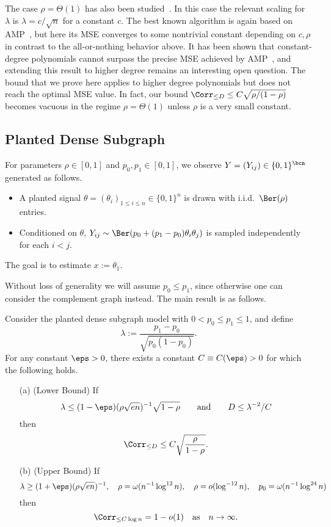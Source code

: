 \documentclass[11pt]{article}
\begin{document}
The case $\rho = \Theta(1)$ has also been studied~\cite{DM-sparse-amp,LKZ-sparse,submatrix-ogp,MW-amp}. In this case the relevant scaling for $\lambda$ is $\lambda = c/\sqrt{n}$ for a constant $c$. The best known algorithm is again based on AMP~\cite{DM-sparse-amp,LKZ-sparse}, but here its MSE converges to some nontrivial constant depending on $c,\rho$ in contrast to the all-or-nothing behavior above. It has been shown that constant-degree polynomials cannot surpass the precise MSE achieved by AMP~\cite{MW-amp}, and extending this result to higher degree remains an interesting open question. The bound that we prove here applies to higher degree polynomials but does not reach the optimal MSE value. In fact, our bound $\Corr_{\le D} \le C\sqrt{\rho/(1-\rho)}$ becomes vacuous in the regime $\rho = \Theta(1)$ unless $\rho$ is a very small constant.




\subsection{Planted Dense Subgraph}

\begin{definition}
For parameters $\rho \in [0,1]$ and $p_0,p_1\in [0,1]$, we observe $Y=(Y_{ij})\in \{0,1\}^{\bcn}$ generated as follows. 
\begin{itemize}
    \item A planted signal $\theta=(\theta_i)_{1\leq i\leq n}\in \{0,1\}^n$ is drawn with i.i.d.\ $\Ber(\rho)$ entries.
    \item Conditioned on $\theta$, $Y_{ij}\sim \Ber(p_0+(p_1-p_0)\theta_i \theta_j)$ is sampled independently for each $i<j$. 
\end{itemize}
The goal is to estimate $x := \theta_1$.
\end{definition}


\noindent Without loss of generality we will assume $p_0\leq p_1$, since otherwise one can consider the complement graph instead. The main result is as follows. 
\begin{theorem}\label{thm:main-pds}
Consider the planted dense subgraph model with $0<p_0 \le p_1 \le 1$, and define
\begin{equation}\label{eq:lambda-sub}
\lambda := \frac{p_1-p_0}{\sqrt{p_0(1-p_0)}}.
\end{equation}
For any constant $\eps>0$, there exists a constant $C\equiv C(\eps)>0$ for which the following holds.
\begin{enumerate}
\item[(a)] (Lower Bound) If
\[ \lambda \le (1-\eps)(\rho\sqrt{en})^{-1}\sqrt{1-\rho} \qquad \text{and} \qquad D \le \lambda^{-2}/C \]
then
\[ \Corr_{\le D} \le C \sqrt{\frac{\rho}{1-\rho}}. \]
\item[(b)] (Upper Bound) If
\[ \lambda \ge (1+\eps)(\rho\sqrt{en})^{-1}, \quad \rho = \omega(n^{-1} \log^{12} n), \quad \rho = o(\log^{-12} n), \quad p_0 = \omega(n^{-1} \log^{24} n) \]
then
\[ \Corr_{\le C \log n} = 1-o(1) \quad \text{as} \quad n \to \infty. \]
\end{enumerate}
\end{theorem}
\end{document}
